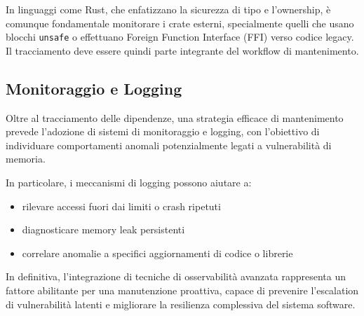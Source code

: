 In linguaggi come Rust, che enfatizzano la sicurezza di tipo e l'ownership, è
comunque fondamentale monitorare i crate esterni, specialmente quelli che usano blocchi
\texttt{unsafe} o effettuano Foreign Function Interface (FFI) verso codice legacy. Il tracciamento deve essere
quindi parte integrante del workflow di mantenimento.

\subsection{Monitoraggio e Logging}
\label{sec:monitoraggio-logging}

Oltre al tracciamento delle dipendenze, una strategia efficace di mantenimento prevede
l'adozione di sistemi di monitoraggio e logging, con l'obiettivo di individuare
comportamenti anomali potenzialmente legati a vulnerabilità di memoria.

In particolare, i meccanismi di logging possono aiutare a:
\begin{itemize}
  \item rilevare accessi fuori dai limiti o crash ripetuti

  \item diagnosticare memory leak persistenti

  \item correlare anomalie a specifici aggiornamenti di codice o librerie
\end{itemize}

In definitiva, l'integrazione di tecniche di osservabilità avanzata rappresenta un
fattore abilitante per una manutenzione proattiva, capace di prevenire l'escalation
di vulnerabilità latenti e migliorare la resilienza complessiva del sistema
software.